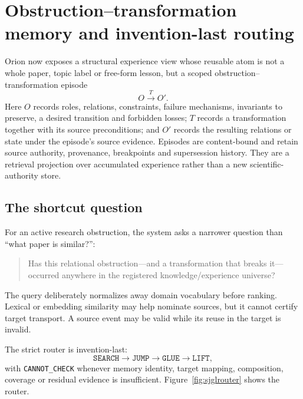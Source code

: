 \section{Obstruction--transformation memory and invention-last routing}
\label{sec:semantic-shortcut}

Orion now exposes a structural experience view whose reusable atom is not a whole paper, topic label or free-form lesson, but a scoped obstruction--transformation episode
\begin{equation}
O\xrightarrow{T}O'.
\end{equation}
Here $O$ records roles, relations, constraints, failure mechanisms, invariants to preserve, a desired transition and forbidden losses; $T$ records a transformation together with its source preconditions; and $O'$ records the resulting relations or state under the episode's source evidence. Episodes are content-bound and retain source authority, provenance, breakpoints and supersession history. They are a retrieval projection over accumulated experience rather than a new scientific-authority store.

\subsection{The shortcut question}

For an active research obstruction, the system asks a narrower question than ``what paper is similar?'':

\begin{quote}
Has this relational obstruction---and a transformation that breaks it---occurred anywhere in the registered knowledge/experience universe?
\end{quote}

The query deliberately normalizes away domain vocabulary before ranking. Lexical or embedding similarity may help nominate sources, but it cannot certify target transport. A source event may be valid while its reuse in the target is invalid.

The strict router is invention-last:
\begin{equation}
\texttt{SEARCH}\rightarrow\texttt{JUMP}\rightarrow\texttt{GLUE}\rightarrow\texttt{LIFT},
\end{equation}
with \texttt{CANNOT\_CHECK} whenever memory identity, target mapping, composition, coverage or residual evidence is insufficient. Figure~\ref{fig:sjglrouter} shows the router.

